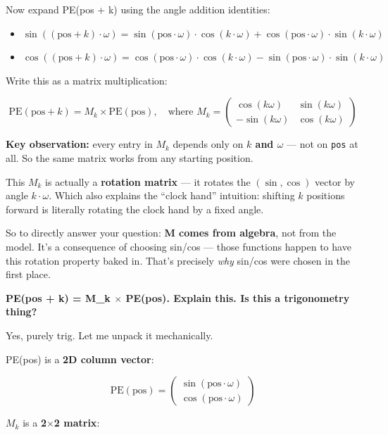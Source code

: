 Now expand PE(pos + k) using the angle addition identities:

\begin{itemize}
  \item $\sin((\text{pos}+k) \cdot \omega) = \sin(\text{pos} \cdot \omega) \cdot \cos(k \cdot \omega) + \cos(\text{pos} \cdot \omega) \cdot \sin(k \cdot \omega)$
  \item $\cos((\text{pos}+k) \cdot \omega) = \cos(\text{pos} \cdot \omega) \cdot \cos(k \cdot \omega) - \sin(\text{pos} \cdot \omega) \cdot \sin(k \cdot \omega)$
\end{itemize}

Write this as a matrix multiplication:

\[
\text{PE}(\text{pos} + k) = M_k \times \text{PE}(\text{pos}), \quad \text{where } M_k = \begin{pmatrix} \cos(k\omega) & \sin(k\omega) \\ -\sin(k\omega) & \cos(k\omega) \end{pmatrix}
\]

\textbf{Key observation:} every entry in $M_k$ depends only on \textbf{$k$ and $\omega$} --- not on \texttt{pos} at all. So the same matrix works from any starting position.

This $M_k$ is actually a \textbf{rotation matrix} --- it rotates the $(\sin, \cos)$ vector by angle $k \cdot \omega$. Which also explains the ``clock hand'' intuition: shifting $k$ positions forward is literally rotating the clock hand by a fixed angle.

So to directly answer your question: \textbf{M comes from algebra}, not from the model. It's a consequence of choosing sin/cos --- those functions happen to have this rotation property baked in. That's precisely \textit{why} sin/cos were chosen in the first place.

\bigskip

\textbf{PE(pos + k) = M\_k $\times$ PE(pos). Explain this. Is this a trigonometry thing?}

Yes, purely trig. Let me unpack it mechanically.

PE(pos) is a \textbf{2D column vector}:

\[
\text{PE}(\text{pos}) = \begin{pmatrix} \sin(\text{pos} \cdot \omega) \\ \cos(\text{pos} \cdot \omega) \end{pmatrix}
\]

$M_k$ is a \textbf{2$\times$2 matrix}:

